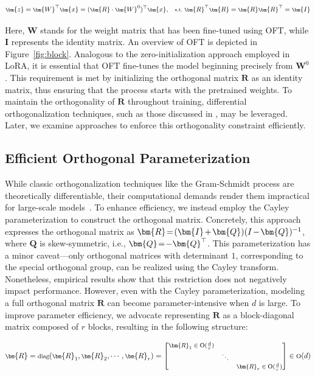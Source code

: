 \begin{equation}\label{eq:oft_general}
    \footnotesize
    \bm{z}=\bm{W}^\top\bm{x}=(\bm{R}\cdot\bm{W}^0)^\top\bm{x},~~~\text{s.t.}~\bm{R}^\top\bm{R}=\bm{R}\bm{R}^\top=\bm{I}
\end{equation}

Here, $\bm{W}$ stands for the weight matrix that has been fine-tuned using OFT, while $\bm{I}$ represents the identity matrix. An overview of OFT is depicted in Figure~\ref{fig:block}. Analogous to the zero-initialization approach employed in LoRA, it is essential that OFT fine-tunes the model beginning precisely from $\bm{W}^0$. This requirement is met by initializing the orthogonal matrix $\bm{R}$ as an identity matrix, thus ensuring that the process starts with the pretrained weights. To maintain the orthogonality of $\bm{R}$ throughout training, differential orthogonalization techniques, such as those discussed in \cite{liu2021orthogonal,lezcano2019cheap}, may be leveraged. Later, we examine approaches to enforce this orthogonality constraint efficiently.

\subsection{Efficient Orthogonal Parameterization}\label{sect:eff_ortho}

While classic orthogonalization techniques like the Gram-Schmidt process are theoretically differentiable, their computational demands render them impractical for large-scale models~\cite{liu2021orthogonal}. To enhance efficiency, we instead employ the Cayley parameterization to construct the orthogonal matrix. Concretely, this approach expresses the orthogonal matrix as $\thickmuskip=2mu \medmuskip=2mu \bm{R}=(\bm{I}+\bm{Q})(I-\bm{Q})^{-1}$, where $\bm{Q}$ is skew-symmetric, i.e., $\thickmuskip=2mu \medmuskip=2mu \bm{Q}=-\bm{Q}^\top$. This parameterization has a minor caveat—only orthogonal matrices with determinant $1$, corresponding to the special orthogonal group, can be realized using the Cayley transform. Nonetheless, empirical results show that this restriction does not negatively impact performance. However, even with the Cayley parameterization, modeling a full orthogonal matrix $\bm{R}$ can become parameter-intensive when $d$ is large. To improve parameter efficiency, we advocate representing $\bm{R}$ as a block-diagonal matrix composed of $r$ blocks, resulting in the following structure:

\begin{equation}
    \footnotesize
    \bm{R}=\text{diag}(\bm{R}_1,\bm{R}_2,\cdots,\bm{R}_r)=\begin{bmatrix}
    \bm{R}_1\in \text{O}(\frac{d}{r}) &  &\\
    &\ddots & \\
    & & \bm{R}_r\in \text{O}(\frac{d}{r})
    \end{bmatrix}\in \text{O}(d)
\end{equation}

